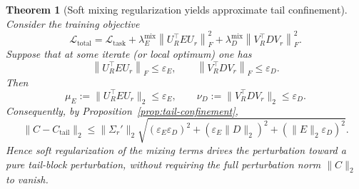 \documentclass[11pt]{article}
\newtheorem{theorem}{Theorem}
\newcommand{\fro}[1]{\left\|#1\right\|_F}
\newcommand{\op}[1]{\left\|#1\right\|_2}
\begin{document}

\begin{theorem}[Soft mixing regularization yields approximate tail confinement]
\label{thm:soft-mix}
Consider the training objective
\[
\mathcal{L}_{\mathrm{total}}
=
\mathcal{L}_{\mathrm{task}}
+
\lambda_E^{\mathrm{mix}}\fro{U_R^\top E U_r}^2
+
\lambda_D^{\mathrm{mix}}\fro{V_R^\top D V_r}^2.
\]
Suppose that at some iterate (or local optimum) one has
\[
\fro{U_R^\top E U_r}\le \varepsilon_E,
\qquad
\fro{V_R^\top D V_r}\le \varepsilon_D.
\]
Then
\[
\mu_E := \|U_R^\top E U_r\|_2 \le \varepsilon_E,
\qquad
\nu_D := \|V_R^\top D V_r\|_2 \le \varepsilon_D.
\]
Consequently, by Proposition~\ref{prop:tail-confinement},
\[
\|C-C_{\mathrm{tail}}\|_2
\le
\|\Sigma_r'\|_2
\sqrt{
(\varepsilon_E\varepsilon_D)^2
+
(\varepsilon_E\|D\|_2)^2
+
(\|E\|_2\varepsilon_D)^2
}.
\]
Hence soft regularization of the mixing terms drives the perturbation toward a pure tail-block perturbation, without requiring the full perturbation norm \(\|C\|_2\) to vanish.
\end{theorem}
\end{document}

